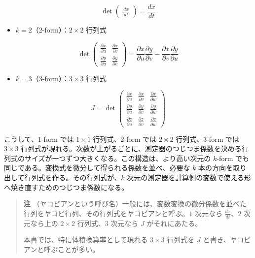 \documentclass[a4paper,12pt,openany]{book}
\providecommand{\tightlist}{%
  \setlength{\itemsep}{0pt}\setlength{\parskip}{0pt}}
\begin{document}
\[
\det
\begin{pmatrix}
\frac{dx}{dt}
\end{pmatrix}
=
\frac{dx}{dt}
\]

\begin{itemize}
\tightlist
\item
  \(k=2\)（\(2\)-form）：\(2 \times 2\) 行列式
\end{itemize}

\[
\det
\begin{pmatrix}
\frac{\partial x}{\partial u} & \frac{\partial x}{\partial v}\\[4pt]
\frac{\partial y}{\partial u} & \frac{\partial y}{\partial v}
\end{pmatrix}
=
\frac{\partial x}{\partial u}\frac{\partial y}{\partial v}
-
\frac{\partial x}{\partial v}\frac{\partial y}{\partial u}
\]

\begin{itemize}
\tightlist
\item
  \(k=3\)（\(3\)-form）：\(3 \times 3\) 行列式
\end{itemize}

\[
J
=
\det
\begin{pmatrix}
\frac{\partial x}{\partial u} & \frac{\partial x}{\partial v} & \frac{\partial x}{\partial w}\\[4pt]
\frac{\partial y}{\partial u} & \frac{\partial y}{\partial v} & \frac{\partial y}{\partial w}\\[4pt]
\frac{\partial z}{\partial u} & \frac{\partial z}{\partial v} & \frac{\partial z}{\partial w}
\end{pmatrix}
\]

こうして、\(1\)-form では \(1\times1\) 行列式、\(2\)-form では
\(2\times2\) 行列式、\(3\)-form では \(3\times3\)
行列式が現れる。次数が上がるごとに、測定器のつじつま係数を決める行列式のサイズが一つずつ大きくなる。この構造は、より高い次元の
\(k\)-form でも同じである。変換式を微分して得られる係数を並べ、必要な
\(k\) 本の方向を取り出して行列式を作る。その行列式が、\(k\)
次元の測定器を計算側の変数で使える形へ焼き直すためのつじつま係数になる。

\begin{quote}
\textbf{注}
（ヤコビアンという呼び名）一般には、変数変換の微分係数を並べた行列をヤコビ行列、その行列式をヤコビアンと呼ぶ。\(1\)
次元なら \(\frac{dx}{dt}\)、\(2\) 次元なら上の \(2\times2\)
行列式、\(3\) 次元なら \(J\) がそれにあたる。

本書では、特に体積換算率として現れる \(3\times3\) 行列式を \(J\)
と書き、ヤコビアンと呼ぶことが多い。
\end{quote}
\end{document}
